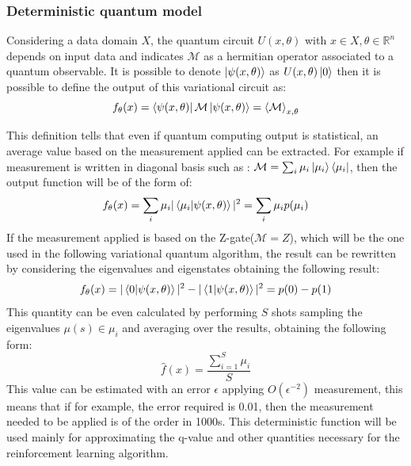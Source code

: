 \subsubsection{Deterministic quantum model}
\begin{mydef}
	Considering a data domain $X$, the quantum circuit $U(x, \theta)$ with $x \in X, \theta \in \mathbb{R}^n$ depends on input data and indicates $\mathcal{M}$ as a hermitian operator associated to a quantum observable. It is possible to denote $\ket{\psi(x,\theta)}$ as  $U(x,\theta)\ket{0}$ then it is possible to define the output of this variational circuit as:
	\begin{equation}\label{quantum deterministic}
		f_\theta(x) = \bra{\psi(x, \theta)} \mathcal{M}  \ket{\psi(x, \theta)} = \braket{\mathcal{M}}_{x,\theta}
	\end{equation}
\end{mydef}
This definition tells that even if quantum computing output is statistical, an average value based on the measurement applied can be extracted. For example if measurement is written in diagonal basis such as : $\mathcal{M} = \sum_i \mu_i \ket{\mu_i} \bra{\mu_i}$, then the output function will be of the form of:
\begin{equation*}
	f_\theta(x) = \sum_i \mu_i |\braket{\mu_i |\psi(x, \theta)}|^2 = \sum_i \mu_i p(\mu_i)
\end{equation*}
If the measurement applied is based on the Z-gate($\mathcal{M} = Z$), which will be the one used in the following variational quantum algorithm, the result can be rewritten by considering the eigenvalues and eigenstates obtaining the following result:
\begin{equation*}
	f_\theta(x) = |\braket{0|\psi(x, \theta)}|^2 - |\braket{1| \psi(x, \theta)}|^2 = p(0) - p(1)
\end{equation*}
This quantity can be even calculated by performing $S$ shots sampling the eigenvalues $\mu(s) \in {\mu_i}$ and averaging over the results, obtaining the following form:
\begin{equation*}
	\hat{f}(x) = \frac{\sum_{i=1}^{S}\mu_i}{S}
\end{equation*}
This value can be estimated with an error $\epsilon$ applying $O(\epsilon^{-2})$ measurement, this means that if for example, the error required is 0.01, then the measurement needed to be applied is of the order in 1000s. This deterministic function will be used mainly for approximating the q-value and other quantities necessary for the reinforcement learning algorithm. 
